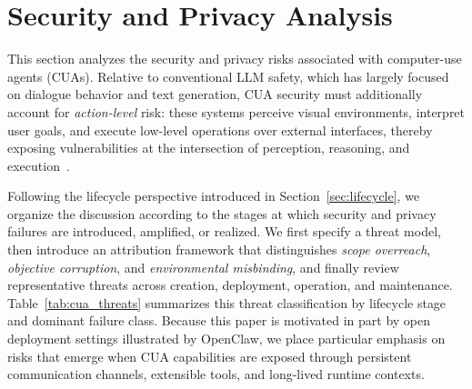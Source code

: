 \section{Security and Privacy Analysis}
\label{sec:security}

This section analyzes the security and privacy risks associated with computer-use agents (CUAs). Relative to conventional LLM safety, which has largely focused on dialogue behavior and text generation, CUA security must additionally account for \emph{action-level} risk: these systems perceive visual environments, interpret user goals, and execute low-level operations over external interfaces, thereby exposing vulnerabilities at the intersection of perception, reasoning, and execution~\cite{jones2025systematization,foerster2026camels,qian2026zero}.

Following the lifecycle perspective introduced in Section~\ref{sec:lifecycle}, we organize the discussion according to the stages at which security and privacy failures are introduced, amplified, or realized. We first specify a threat model, then introduce an attribution framework that distinguishes \emph{scope overreach}, \emph{objective corruption}, and \emph{environmental misbinding}, and finally review representative threats across creation, deployment, operation, and maintenance. Table~\ref{tab:cua_threats} summarizes this threat classification by lifecycle stage and dominant failure class. Because this paper is motivated in part by open deployment settings illustrated by OpenClaw, we place particular emphasis on risks that emerge when CUA capabilities are exposed through persistent communication channels, extensible tools, and long-lived runtime contexts.

